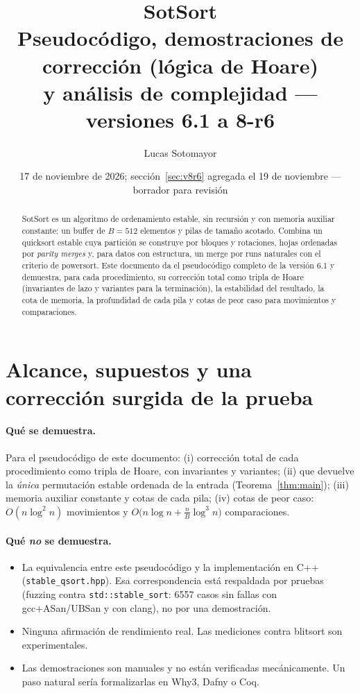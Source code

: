 \documentclass[10pt,a4paper]{article}
\title{\textbf{SotSort}\\[3pt]\large Pseudocódigo, demostraciones de corrección (lógica de Hoare)\\ y análisis de complejidad --- versiones 6.1 a 8-r6}
\author{Lucas Sotomayor}
\date{17 de noviembre de 2026; sección~\ref{sec:v8r6} agregada el 19 de noviembre --- borrador para revisión}
\theoremstyle{plain}
\theoremstyle{definition}
\theoremstyle{remark}
\newcommand{\Bsz}{B}
\begin{document}
\maketitle

\begin{abstract}
SotSort es un algoritmo de ordenamiento estable, sin recursión y con memoria
auxiliar constante: un buffer de $\Bsz=512$ elementos y pilas de tamaño acotado.
Combina un quicksort estable cuya partición se construye por bloques y rotaciones,
hojas ordenadas por \emph{parity merges} y, para datos con estructura, un merge por
runs naturales con el criterio de powersort. Este documento da el pseudocódigo
completo de la versión 6.1 y demuestra, para cada procedimiento, su corrección
total como tripla de Hoare (invariantes de lazo y variantes para la terminación), la
estabilidad del resultado, la cota de memoria, la profundidad de cada pila y cotas
de peor caso para movimientos y comparaciones.
\end{abstract}

\tableofcontents

\section{Alcance, supuestos y una corrección surgida de la prueba}

\paragraph{Qué se demuestra.} Para el pseudocódigo de este documento:
(i) corrección total de cada procedimiento como tripla de Hoare, con invariantes y
variantes; (ii) que \SotSort devuelve la \emph{única} permutación estable ordenada de
la entrada (Teorema~\ref{thm:main}); (iii) memoria auxiliar constante y cotas de cada
pila; (iv) cotas de peor caso: $O(n\log^2 n)$ movimientos y
$O\!\big(n\log n + \tfrac{n}{\Bsz}\log^3 n\big)$ comparaciones.

\paragraph{Qué \emph{no} se demuestra.}
\begin{itemize}[nosep]
\item La equivalencia entre este pseudocódigo y la implementación en C++
  (\texttt{stable\_qsort.hpp}). Esa correspondencia está respaldada por pruebas
  (fuzzing contra \texttt{std::stable\_sort}: 6557 casos sin fallas con
  gcc+ASan/UBSan y con clang), no por una demostración.
\item Ninguna afirmación de rendimiento real. Las mediciones contra blitsort son
  experimentales.
\item Las demostraciones son manuales y no están verificadas mecánicamente. Un paso
  natural sería formalizarlas en Why3, Dafny o Coq.
\end{itemize}
\end{document}
